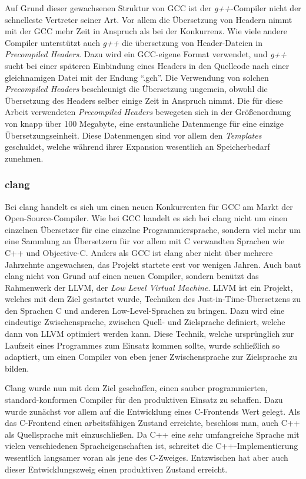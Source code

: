 Auf Grund dieser gewachsenen Struktur von GCC ist der \textit{g++}-Compiler nicht der schnelleste Vertreter seiner Art. Vor allem die Übersetzung von Headern nimmt mit der GCC mehr Zeit in Anspruch als
bei der Konkurrenz. Wie viele andere Compiler unterstützt auch \textit{g++} die übersetzung von Header-Dateien in \textit{Precompiled Headers}. Dazu wird ein GCC-eigene Format verwendet, und \textit{g++} sucht bei einer
späteren Einbindung eines Headers in den Quellcode nach einer gleichnamigen Datei mit der Endung ``.gch''. Die Verwendung von solchen \textit{Precompiled Headers} beschleunigt die Übersetzung ungemein, 
obwohl die Übersetzung des Headers selber einige Zeit in Anspruch nimmt. Die für diese Arbeit verwendeten \textit{Precompiled Headers} bewegeten sich in der Größenordnung von knapp über 100 Megabyte, 
eine erstaunliche Datenmenge für eine einzige Übersetzungseinheit. Diese Datenmengen sind vor allem den \textit{Templates} geschuldet, welche während ihrer Expansion wesentlich an Speicherbedarf zunehmen.

\subsubsection{clang}
Bei clang handelt es sich um einen neuen Konkurrenten für GCC am Markt der Open-Source-Compiler. Wie bei GCC handelt es sich bei clang nicht um einen einzelnen Übersetzer für eine einzelne Programmiersprache,
sondern viel mehr um eine Sammlung an Übersetzern für vor allem mit C verwandten Sprachen wie C++ und Objective-C. Anders als GCC ist clang aber nicht über mehrere Jahrzehnte angewachsen, das Projekt
startete erst vor wenigen Jahren. Auch baut clang nicht von Grund auf einen neuen Compiler, sondern benützt das Rahmenwerk der LLVM, der \textit{Low Level Virtual Machine}. LLVM ist ein Projekt, welches
mit dem Ziel gestartet wurde, Techniken des Just-in-Time-Übersetzens zu den Sprachen C und anderen Low-Level-Sprachen zu bringen. Dazu wird eine eindeutige Zwischensprache, zwischen Quell- und Zielsprache
definiert, welche dann von LLVM optimiert werden kann. Diese Technik, welche ursprünglich zur Laufzeit eines Programmes zum Einsatz kommen sollte, wurde schließlich so adaptiert, um einen Compiler von
eben jener Zwischensprache zur Zielsprache zu bilden. 

Clang wurde nun mit dem Ziel geschaffen, einen sauber programmierten, standard-konformen Compiler für den produktiven Einsatz zu schaffen. Dazu wurde zunächst vor allem auf die Entwicklung eines C-Frontends
Wert gelegt. Als das C-Frontend einen arbeitsfähigen Zustand erreichte, beschloss man, auch C++ als Quellsprache mit einzuschließen. Da C++ eine sehr umfangreiche Sprache mit vielen verschiedenen Spracheigenschaften 
ist, schreitet die C++-Implementierung wesentlich langsamer voran als jene des C-Zweiges. Entzwischen hat aber auch dieser Entwicklungszweig einen produktiven Zustand erreicht. 

